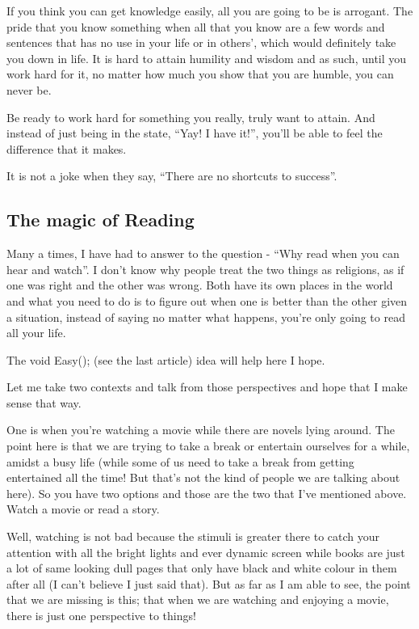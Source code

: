 \documentclass[twoside,11pt,titlepage]{article}
\begin{document}
If you think you can get knowledge easily, all you are going to be is arrogant. The pride that you know something when all that you know are a few words and sentences that has no use in your life or in others', which would definitely take you down in life. It is hard to attain humility and wisdom and as such, until you work hard for it, no matter how much you show that you are humble, you can never be.

Be ready to work hard for something you really, truly want to attain. And instead of just being in the state, ``Yay! I have it!'', you'll be able to feel the difference that it makes.

It is not a joke when they say, ``There are no shortcuts to success''.

\newpage
\begin{center}
  \section{The magic of Reading}
\end{center}
\bigskip
\bigskip
\bigskip

Many a times, I have had to answer to the question - ``Why read when you can hear and watch''. I don't know why people treat the two things as religions, as if one was right and the other was wrong. Both have its own places in the world and what you need to do is to figure out when one is better than the other given a situation, instead of saying no matter what happens, you're only going to read all your life.

The void Easy(); (see the last article) idea will help here I hope.

Let me take two contexts and talk from those perspectives and hope that I make sense that way.

One is when you're watching a movie while there are novels lying around. The point here is that we are trying to take a break or entertain ourselves for a while, amidst a busy life (while some of us need to take a break from getting entertained all the time! But that's not the kind of people we are talking about here). So you have two options and those are the two that I've mentioned above. Watch a movie or read a story.

Well, watching is not bad because the stimuli is greater there to catch your attention with all the bright lights and ever dynamic screen while books are just a lot of same looking dull pages that only have black and white colour in them after all (I can't believe I just said that). But as far as I am able to see, the point that we are missing is this; that when we are watching and enjoying a movie, there is just one perspective to things!
\end{document}
